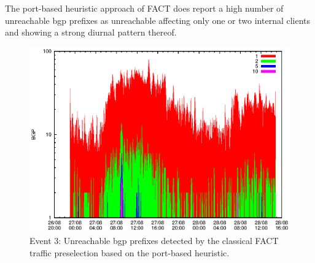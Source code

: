 The port-based heuristic approach of \gls{FACT} does report a high number of 
unreachable \gls{bgp} prefixes as unreachable affecting only one or two internal 
clients and showing a strong diurnal pattern thereof. 

\begin{figure}
	[p] \centering 
	\includegraphics[width=0.75\linewidth]{images/events/2010_08_27/bgp_log_port80_ref.eps} \caption{Event 3: Unreachable \gls{bgp} prefixes detected by the classical \gls{FACT} traffic preselection based on the port-based heuristic.} 
	\label{fig:RIPE_FACT_REF} 
\end{figure}

